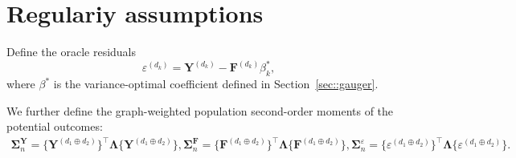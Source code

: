 \documentclass[twoside]{article}
\theoremstyle{plain}
\theoremstyle{definition}
\theoremstyle{remark}
\newcommand{\bY}{\boldsymbol{Y}}
\newcommand{\bF}{\boldsymbol{F}}
\newcommand{\bLambda}{\boldsymbol{\Lambda}}
\newcommand{\bSigma}{\boldsymbol{\Sigma}}
\begin{document}
\section{Regulariy assumptions}\label{sec:regularity-condition}
 Define the oracle residuals
\[
\varepsilon^{(d_k)} = \bY^{(d_k)} - \bF^{(d_k)} \beta_k^*,
\]
where $\beta^*$ is the variance-optimal coefficient defined in Section~\ref{sec::gauger}.

We further define the graph-weighted population second-order moments
of the potential outcomes:
\begin{gather*}
\bSigma^{\bY}_n = \{\bY^{(d_1 \oplus d_2)}\}^{\top} \bLambda \{\bY^{(d_1 \oplus d_2)}\},
\bSigma^{\bF}_n = \{\bF^{(d_1 \oplus d_2)}\}^{\top} \bLambda \{\bF^{(d_1 \oplus d_2)}\},
\bSigma^{\varepsilon}_n = \{\varepsilon^{(d_1 \oplus d_2)}\}^{\top} \bLambda \{\varepsilon^{(d_1 \oplus d_2)}\}.
\end{gather*}
\end{document}
